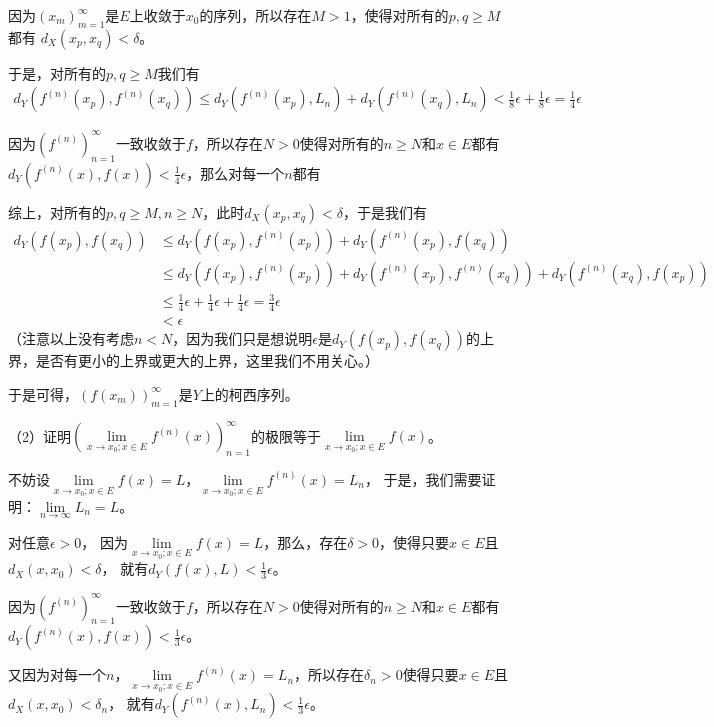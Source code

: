 \documentclass{article}
\begin{document}
因为$(x_m)_{m = 1}^\infty$是$E$上收敛于$x_0$的序列，所以存在$M > 1$，使得对所有的$p, q \geq M$都有
$d_X(x_p, x_q) < \delta$。

于是，对所有的$p, q \geq M$我们有
\begin{align*}
  d_Y(f^{(n)}(x_p), f^{(n)}(x_q)) \leq  d_Y(f^{(n)}(x_p), L_n) + d_Y(f^{(n)}(x_q), L_n) < \frac{1}{8} \epsilon + \frac{1}{8} \epsilon = \frac{1}{4} \epsilon
\end{align*}

因为$(f^{(n)})_{n = 1}^\infty$一致收敛于$f$，所以存在$N > 0$使得对所有的$n \geq N$和$x \in E$都有
$d_Y(f^{(n)}(x), f(x)) < \frac{1}{4}\epsilon$，那么对每一个$n$都有

综上，对所有的$p, q \geq M,n \geq N$，此时$d_X(x_p, x_q) < \delta$，于是我们有
\begin{align*}
  d_Y(f(x_p), f(x_q)) & \leq d_Y(f(x_p), f^{(n)}(x_p)) + d_Y(f^{(n)}(x_p), f(x_q))                                    \\
                      & \leq d_Y(f(x_p), f^{(n)}(x_p)) + d_Y(f^{(n)}(x_p), f^{(n)}(x_q)) + d_Y(f^{(n)}(x_q), f(x_p))  \\
                      & \leq \frac{1}{4} \epsilon + \frac{1}{4} \epsilon + \frac{1}{4} \epsilon = \frac{3}{4}\epsilon \\
                      & < \epsilon
\end{align*}
（注意以上没有考虑$n < N$，因为我们只是想说明$\epsilon$是$d_Y(f(x_p), f(x_q))$的上界，是否有更小的上界或更大的上界，这里我们不用关心。）

于是可得，$(f(x_m))_{m = 1}^\infty$是$Y$上的柯西序列。

（2）证明$(\lim\limits_{x \to x_0; x \in E} f^{(n)}(x))_{n = 1}^\infty$的极限等于$\lim\limits_{x \to x_0; x \in E} f(x)$。

不妨设$\lim\limits_{x \to x_0; x \in E} f(x) = L$，$\lim\limits_{x \to x_0; x \in E} f^{(n)}(x) = L_n$，
于是，我们需要证明：$\lim\limits_{n \to \infty} L_n = L$。

对任意$\epsilon > 0$，
因为$\lim\limits_{x \to x_0; x \in E} f(x) = L$，那么，存在$\delta > 0$，使得只要$x \in E$且$d_X(x, x_0) < \delta$，
就有$d_Y(f(x), L) < \frac{1}{3} \epsilon$。

因为$(f^{(n)})_{n = 1}^\infty$一致收敛于$f$，所以存在$N > 0$使得对所有的$n \geq N$和$x \in E$都有
$d_Y(f^{(n)}(x), f(x)) < \frac{1}{3} \epsilon$。

又因为对每一个$n$，$\lim\limits_{x \to x_0; x \in E} f^{(n)}(x) = L_n$，所以存在$\delta_n > 0$使得只要$x \in E$且$d_X(x, x_0) < \delta_n$，
就有$d_Y(f^{(n)}(x), L_n) < \frac{1}{3} \epsilon$。
\end{document}

